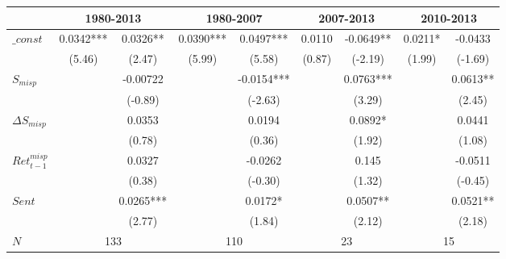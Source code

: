 \begin{tabular}{l|cc|cc|cc|cc}
\toprule
        & \multicolumn{2}{c|}{1980-2013} & \multicolumn{2}{c|}{1980-2007} & \multicolumn{2}{c|}{2007-2013} & \multicolumn{2}{c}{2010-2013} \\
\midrule
$\_const$ & 0.0342*** & 0.0326** & 0.0390*** & 0.0497*** & 0.0110  & -0.0649** & 0.0211* & -0.0433 \\
        & (5.46)  & (2.47)  & (5.99)  & (5.58)  & (0.87)  & (-2.19) & (1.99)  & (-1.69) \\
$S_{misp}$ &         & -0.00722 &         & -0.0154*** &         & 0.0763*** &         & 0.0613** \\
        &         & (-0.89) &         & (-2.63) &         & (3.29)  &         & (2.45) \\
$\Delta S_{misp}$ &         & 0.0353  &         & 0.0194  &         & 0.0892* &         & 0.0441 \\
        &         & (0.78)  &         & (0.36)  &         & (1.92)  &         & (1.08) \\
$Ret^{misp}_{t-1}$ &         & 0.0327  &         & -0.0262 &         & 0.145   &         & -0.0511 \\
        &         & (0.38)  &         & (-0.30) &         & (1.32)  &         & (-0.45) \\
$Sent$  &         & 0.0265*** &         & 0.0172* &         & 0.0507** &         & 0.0521** \\
        &         & (2.77)  &         & (1.84)  &         & (2.12)  &         & (2.18) \\
\midrule
$N$     & \multicolumn{2}{c|}{133} & \multicolumn{2}{c|}{110} & \multicolumn{2}{c|}{23} & \multicolumn{2}{c}{15} \\
\bottomrule
\end{tabular}%
